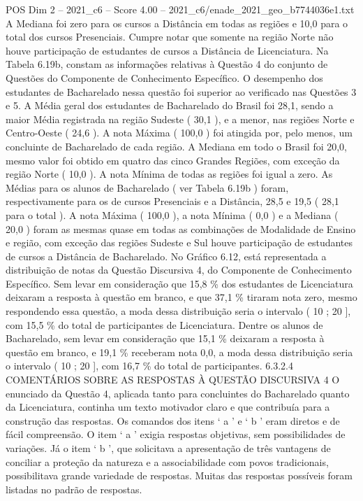\begin{textsample}{POS Dim 2 – 2021\_c6 – Score 4.00 – 2021\_c6/enade\_2021\_geo\_b7744036e1.txt}
A Mediana foi zero para os cursos a Distância em todas as regiões e 10,0 para o total dos cursos Presenciais.
Cumpre notar que somente na região Norte não houve participação de estudantes de cursos a Distância de Licenciatura.
Na Tabela 6.19b, constam as informações relativas à Questão 4 do conjunto de Questões do Componente de Conhecimento Específico.
O desempenho dos estudantes de Bacharelado nessa questão foi superior ao verificado nas Questões 3 e 5.
A Média geral dos estudantes de Bacharelado do Brasil foi 28,1, sendo a maior Média registrada na região Sudeste ( 30,1 ), e a menor, nas regiões Norte e Centro-Oeste ( 24,6 ).
A nota Máxima ( 100,0 ) foi atingida por, pelo menos, um concluinte de Bacharelado de cada região.
A Mediana em todo o Brasil foi 20,0, mesmo valor foi obtido em quatro das cinco Grandes Regiões, com exceção da região Norte ( 10,0 ).
A nota Mínima de todas as regiões foi igual a zero.
As Médias para os alunos de Bacharelado ( ver Tabela 6.19b ) foram, respectivamente para os de cursos Presenciais e a Distância, 28,5 e 19,5 ( 28,1 para o total ).
A nota Máxima ( 100,0 ), a nota Mínima ( 0,0 ) e a Mediana ( 20,0 ) foram as mesmas quase em todas as combinações de Modalidade de Ensino e região, com exceção das regiões Sudeste e Sul houve participação de estudantes de cursos a Distância de Bacharelado.
No Gráfico 6.12, está representada a distribuição de notas da Questão Discursiva 4, do Componente de Conhecimento Específico.
Sem levar em consideração que 15,8 \% dos estudantes de Licenciatura deixaram a resposta à questão em branco, e que 37,1 \% tiraram nota zero, mesmo respondendo essa questão, a moda dessa distribuição seria o intervalo ( 10 ; 20 ], com 15,5 \% do total de participantes de Licenciatura.
Dentre os alunos de Bacharelado, sem levar em consideração que 15,1 \% deixaram a resposta à questão em branco, e 19,1 \% receberam nota 0,0, a moda dessa distribuição seria o intervalo ( 10 ; 20 ], com 16,7 \% do total de participantes. 6.3.2.4 COMENTÁRIOS SOBRE AS RESPOSTAS À QUESTÃO DISCURSIVA 4 O enunciado da Questão 4, aplicada tanto para concluintes do Bacharelado quanto da Licenciatura, continha um texto motivador claro e que contribuía para a construção das respostas.
Os comandos dos itens ‘ a ’ e ‘ b ’ eram diretos e de fácil compreensão.
O item ‘ a ’ exigia respostas objetivas, sem possibilidades de variações.
Já o item ‘ b ’, que solicitava a apresentação de três vantagens de conciliar a proteção da natureza e a associabilidade com povos tradicionais, possibilitava grande variedade de respostas.
Muitas das respostas possíveis foram listadas no padrão de respostas.

\end{textsample}

